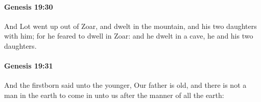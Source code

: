 		\paragraph{Genesis 19:30} %
			\label{GENESIS-19-30}

			And Lot went up out of Zoar, and dwelt in the mountain, and his two daughters with him; for he feared to dwell in Zoar: and he dwelt in a cave, he and his two daughters.


		\paragraph{Genesis 19:31} %
			\label{GENESIS-19-31}

			And the firstborn said unto the younger, Our father is old, and there is not a man in the earth to come in unto us after the manner of all the earth:


